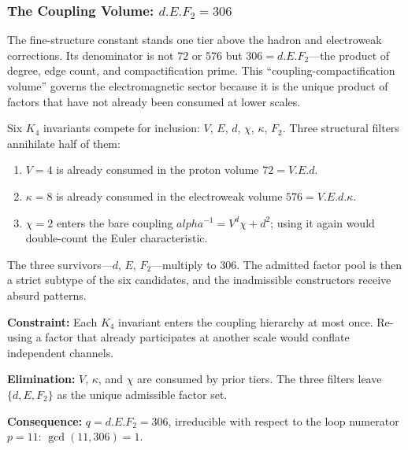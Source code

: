 \documentclass[11pt,a4paper]{book}
\def\alpha{alpha}%
\def\cdot{.}%
\begin{document}
\subsubsection*{The Coupling Volume: $d \cdot E \cdot F_2 = 306$}

The fine-structure constant stands one tier above the hadron and electroweak
corrections.  Its denominator is not $72$ or $576$ but $306 = d \cdot E
\cdot F_2$---the product of degree, edge count, and compactification prime.
This ``coupling-compactification volume'' governs the electromagnetic sector
because it is the unique product of factors that have not already been consumed
at lower scales.

Six $K_4$ invariants compete for inclusion: $V$, $E$, $d$, $\chi$,
$\kappa$, $F_2$.  Three structural filters annihilate half of them:
\begin{enumerate}
\item $V = 4$ is already consumed in the proton volume $72 = V \cdot E
      \cdot d$.
\item $\kappa = 8$ is already consumed in the electroweak volume
      $576 = V \cdot E \cdot d \cdot \kappa$.
\item $\chi = 2$ enters the bare coupling $\alpha^{-1} = V^d \chi + d^2$;
      using it again would double-count the Euler characteristic.
\end{enumerate}
The three survivors---$d$, $E$, $F_2$---multiply to $306$.  The admitted factor
pool is then a strict subtype of the six candidates, and the inadmissible
constructors receive absurd patterns.

\medskip
\noindent
\textbf{Constraint:}
Each $K_4$ invariant enters the coupling hierarchy at most once.  Re-using a
factor that already participates at another scale would conflate independent
channels.

\noindent
\textbf{Elimination:}
$V$, $\kappa$, and $\chi$ are consumed by prior tiers.  The three filters
leave $\{d, E, F_2\}$ as the unique admissible factor set.

\noindent
\textbf{Consequence:}
$q = d \cdot E \cdot F_2 = 306$, irreducible with respect to the loop
numerator $p = 11$: $\gcd(11, 306) = 1$.
\end{document}
